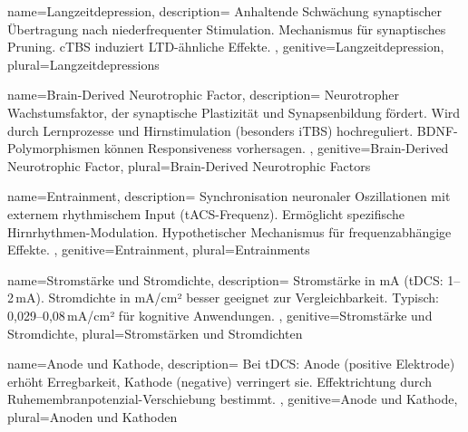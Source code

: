 
{
	name=Langzeitdepression,
	description={
			Anhaltende Schwächung synaptischer Übertragung nach niederfrequenter Stimulation. Mechanismus für synaptisches Pruning. \gls{cTBS} induziert LTD-ähnliche Effekte. \cite{esser_level_2006}
		},
	genitive=Langzeitdepression,
	plural=Langzeitdepressions
}


{
	name=Brain-Derived Neurotrophic Factor,
	description={
			Neurotropher Wachstumsfaktor, der synaptische Plastizität und Synapsenbildung fördert. Wird durch Lernprozesse und Hirnstimulation (besonders \gls{iTBS}) hochreguliert. BDNF-Polymorphismen können Responsiveness vorhersagen. \cite{cavaleiro_memory_2020}
		},
	genitive=Brain-Derived Neurotrophic Factor,
	plural=Brain-Derived Neurotrophic Factors
}


{
	name=Entrainment,
	description={
			Synchronisation neuronaler Oszillationen mit externem rhythmischem Input (\gls{tACS}-Frequenz). Ermöglicht spezifische Hirnrhythmen-Modulation. Hypothetischer Mechanismus für frequenzabhängige Effekte. \cite{akkad_increasing_2021}
		},
	genitive=Entrainment,
	plural=Entrainments
}


{
	name=Stromstärke und Stromdichte,
	description={
			Stromstärke in mA (\gls{tDCS}: 1--2\,mA). Stromdichte in mA/cm² besser geeignet zur Vergleichbarkeit. Typisch: 0,029--0,08\,mA/cm² für kognitive Anwendungen. \cite{woods_technical_2016}
		},
	genitive=Stromstärke und Stromdichte,
	plural=Stromstärken und Stromdichten
}

{
	name=Anode und Kathode,
	description={
			Bei \gls{tDCS}: Anode (positive Elektrode) erhöht Erregbarkeit, Kathode (negative) verringert sie. Effektrichtung durch Ruhemembranpotenzial-Verschiebung bestimmt. \cite{woods_technical_2016}
		},
	genitive=Anode und Kathode,
	plural=Anoden und Kathoden
}

